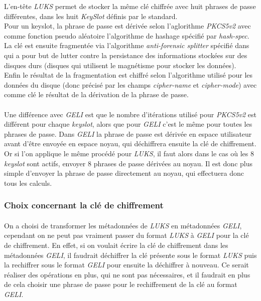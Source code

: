 L'en-tête {\em LUKS} permet de stocker la même clé chiffrée avec huit phrases de passe
différentes, dans les huit {\em KeySlot} définis par le standard.
\\
Pour un keyslot, la phrase de passe est dérivée selon l'aglorithme {\em PKCS5v2}
avec comme fonction pseudo aléatoire l'algorithme de hashage spécifié par 
{\em hash-spec}. La clé est ensuite fragmentée via l'algorithme 
{\em anti-forensic splitter} spécifié dans \cite{AFsplitting} qui a pour but de
lutter contre la persistance des informations stockées sur des disques durs
(disques qui utilisent le magnétisme pour stocker les données).
\\
Enfin le résultat de la fragmentation est chiffré selon l'algorithme utilisé 
pour les données du disque (donc précisé par les champs {\em cipher-name} et 
{\em cipher-mode}) avec comme clé le résultat de la dérivation de la phrase de
passe.

\paragraph{}
Une différence avec {\em GELI} est que le nombre d'itérations utilisé pour 
{\em PKCS5v2} est différent pour chaque {\em keyslot}, alors que pour {\em GELI}
c'est le même pour toutes les phrases de passe.
Dans {\em GELI} la phrase de passe est dérivée en espace utilisateur avant
d'être envoyée en espace noyau, qui déchiffrera ensuite la clé de chiffrement.
Or si l'on applique le même procédé pour {\em LUKS}, il faut alors dans le cas
où les 8 {\em keyslot} sont actifs, envoyer 8 phrases de passe dérivées au noyau.
Il est donc plus simple d'envoyer la phrase de passe directement au noyau, qui
effectuera donc tous les calculs.

\subsubsection{Choix concernant la clé de chiffrement}
\paragraph{}
On a choisi de transformer les métadonnées de {\em LUKS} en métadonnées 
{\em GELI}, cependant on ne peut pas vraiment passer du format {\em LUKS} à 
{\em GELI} pour la clé de chiffrement. En effet, si on voulait écrire la clé 
de chiffrement dans les métadonnées {\em GELI}, il faudrait déchiffrer la clé 
présente sous le format {\em LUKS} puis la rechiffrer sous le format {\em GELI}
pour ensuite la déchiffrer à nouveau. Ce serait réaliser des opérations en plus,
qui ne sont pas nécessaires, et il faudrait en plus de cela choisir une phrase
de passe pour le rechiffrement de la clé au format {\em GELI}. 

